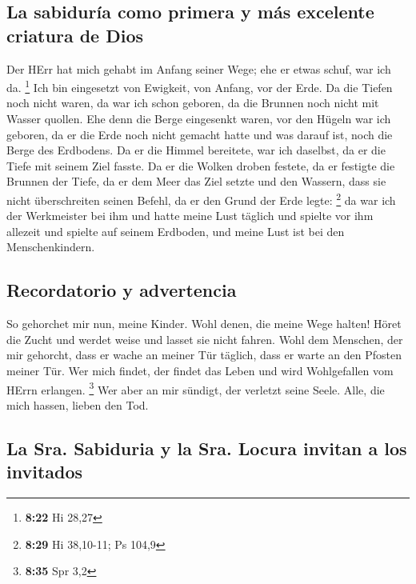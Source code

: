 \hypertarget{la-sabiduruxeda-como-primera-y-muxe1s-excelente-criatura-de-dios}{%
\subsection{La sabiduría como primera y más excelente criatura de
Dios}\label{la-sabiduruxeda-como-primera-y-muxe1s-excelente-criatura-de-dios}}

 Der HErr hat mich gehabt im Anfang seiner Wege; ehe er
etwas schuf, war ich da. \footnote{\textbf{8:22} Hi 28,27}
 Ich bin eingesetzt von Ewigkeit, von Anfang, vor der
Erde.  Da die Tiefen noch nicht waren, da war ich schon
geboren, da die Brunnen noch nicht mit Wasser quollen. 
Ehe denn die Berge eingesenkt waren, vor den Hügeln war ich geboren,
 da er die Erde noch nicht gemacht hatte und was darauf
ist, noch die Berge des Erdbodens.  Da er die Himmel
bereitete, war ich daselbst, da er die Tiefe mit seinem Ziel fasste.
 Da er die Wolken droben festete, da er festigte die
Brunnen der Tiefe,  da er dem Meer das Ziel setzte und
den Wassern, dass sie nicht überschreiten seinen Befehl, da er den Grund
der Erde legte: \footnote{\textbf{8:29} Hi 38,10-11; Ps 104,9}
 da war ich der Werkmeister bei ihm und hatte meine Lust
täglich und spielte vor ihm allezeit  und spielte auf
seinem Erdboden, und meine Lust ist bei den Menschenkindern.

\hypertarget{recordatorio-y-advertencia}{%
\subsection{Recordatorio y
advertencia}\label{recordatorio-y-advertencia}}

 So gehorchet mir nun, meine Kinder. Wohl denen, die
meine Wege halten!  Höret die Zucht und werdet weise und
lasset sie nicht fahren.  Wohl dem Menschen, der mir
gehorcht, dass er wache an meiner Tür täglich, dass er warte an den
Pfosten meiner Tür.  Wer mich findet, der findet das
Leben und wird Wohlgefallen vom HErrn erlangen. \footnote{\textbf{8:35}
  Spr 3,2}  Wer aber an mir sündigt, der verletzt seine
Seele. Alle, die mich hassen, lieben den Tod.

\hypertarget{la-sra.-sabiduria-y-la-sra.-locura-invitan-a-los-invitados}{%
\subsection{La Sra. Sabiduria y la Sra. Locura invitan a los
invitados}\label{la-sra.-sabiduria-y-la-sra.-locura-invitan-a-los-invitados}}

